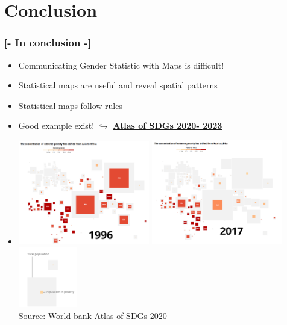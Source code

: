\documentclass[xcolor=x11names,compress]{beamer}
\renewcommand{\(}{\begin{columns}}
\renewcommand{\)}{\end{columns}}
\newcommand{\<}[1]{\begin{column}{#1}}
\renewcommand{\>}{\end{column}}
\begin{document}
%
%

 \section{Conclusion}
 
\begin{frame}
\frametitle{\textcolor{brique}{[-  \textbf{In conclusion }-]}}
\begin{itemize}[<+-|alert@+>]
    \item Communicating Gender Statistic with Maps is difficult!
    \item Statistical maps are useful and reveal spatial patterns
    \item Statistical maps follow rules
    \item Good example exist! $\hookrightarrow$  \href{https://datatopics.worldbank.org/sdgatlas/goal-5-gender-equality?lang=en}{\textbf{Atlas of SDGs 2020- 2023}}
    \item[]
    \includegraphics[width = 0.45\textwidth]{PovertyMapSquares1996.PNG}  
    \includegraphics[width = 0.45\textwidth]{PovertyMapSquares2017.PNG} \\
     \hfill \includegraphics[width = 0.20\textwidth]{PovertyMapSquaresLegend.PNG} \\
   \textcolor{gris}{\footnotesize{Source: \href{https://datatopics.worldbank.org/sdgatlas/archive/2020/goal-1-no-poverty/}{World bank Atlas of SDGs 2020}}}
    

\end{itemize}
\end{frame}
\end{document}
